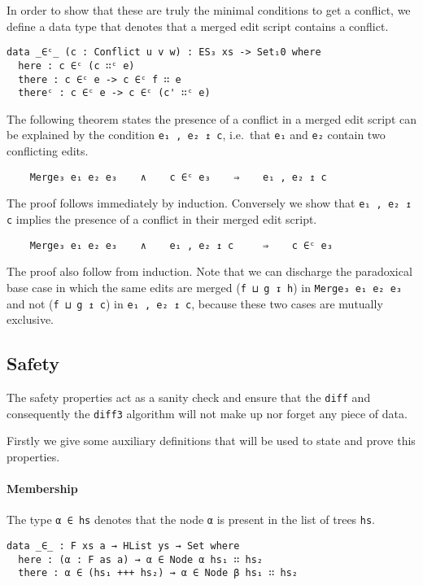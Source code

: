 \documentclass[preprint]{sigplanconf}
\begin{document}
    In order to show that these are truly the minimal conditions to get a conflict,
    we define a data type that denotes that a merged edit script contains a 
    conflict. 

\begin{verbatim}
data _∈ᶜ_ (c : Conflict u v w) : ES₃ xs -> Set₁0 where
  here : c ∈ᶜ (c ∷ᶜ e)
  there : c ∈ᶜ e -> c ∈ᶜ f ∷ e
  thereᶜ : c ∈ᶜ e -> c ∈ᶜ (c' ∷ᶜ e)
\end{verbatim}

    The following theorem states the presence of a conflict in a merged
    edit script can be explained by the condition \texttt{e₁ , e₂ ↥ c}, i.e.\
    that \texttt{e₁} and \texttt{e₂} contain two conflicting edits.

\begin{verbatim}
    Merge₃ e₁ e₂ e₃    ∧    c ∈ᶜ e₃    ⇒    e₁ , e₂ ↥ c
\end{verbatim}
    The proof follows immediately by induction.
    Conversely we show that \texttt{e₁ , e₂ ↥ c} implies the presence
    of a conflict in their merged edit script.
\begin{verbatim}
    Merge₃ e₁ e₂ e₃    ∧    e₁ , e₂ ↥ c     ⇒    c ∈ᶜ e₃
\end{verbatim}
    The proof also follow from induction. Note that we can discharge the paradoxical
    base case in which the same edits are merged (\texttt{f ⊔ g ↧ h}) in 
    \texttt{Merge₃ e₁ e₂ e₃} and not (\texttt{f ⊔ g ↥ c}) in \texttt{e₁ , e₂ ↥ c},
    because these two cases are mutually exclusive.    

    \subsection{Safety}
    The safety properties act as a sanity check and ensure that the \texttt{diff} 
    and consequently the  \texttt{diff3} algorithm will not make up nor forget any 
    piece of data.

    Firstly we give some auxiliary definitions that will be used to state and prove
    this properties.

    \paragraph{Membership}
    The type \texttt{α ∈ hs} denotes that the node \texttt{α} is present
    in the list of trees \texttt{hs}.

\begin{verbatim}
data _∈_ : F xs a → HList ys → Set where
  here : (α : F as a) → α ∈ Node α hs₁ ∷ hs₂
  there : α ∈ (hs₁ +++ hs₂) → α ∈ Node β hs₁ ∷ hs₂
\end{verbatim}
\end{document}
